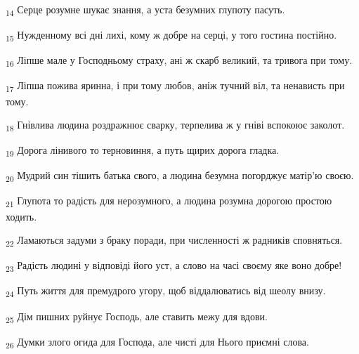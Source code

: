 \begin{tcolorbox}
\textsubscript{14} Серце розумне шукає знання, а уста безумних глупоту пасуть.
\end{tcolorbox}
\begin{tcolorbox}
\textsubscript{15} Нужденному всі дні лихі, кому ж добре на серці, у того гостина постійно.
\end{tcolorbox}
\begin{tcolorbox}
\textsubscript{16} Ліпше мале у Господньому страху, ані ж скарб великий, та тривога при тому.
\end{tcolorbox}
\begin{tcolorbox}
\textsubscript{17} Ліпша пожива яринна, і при тому любов, аніж тучний віл, та ненависть при тому.
\end{tcolorbox}
\begin{tcolorbox}
\textsubscript{18} Гнівлива людина роздражнює сварку, терпелива ж у гніві вспокоює заколот.
\end{tcolorbox}
\begin{tcolorbox}
\textsubscript{19} Дорога лінивого то терновиння, а путь щирих дорога гладка.
\end{tcolorbox}
\begin{tcolorbox}
\textsubscript{20} Мудрий син тішить батька свого, а людина безумна погорджує матір'ю своєю.
\end{tcolorbox}
\begin{tcolorbox}
\textsubscript{21} Глупота то радість для нерозумного, а людина розумна дорогою простою ходить.
\end{tcolorbox}
\begin{tcolorbox}
\textsubscript{22} Ламаються задуми з браку поради, при численності ж радників сповняться.
\end{tcolorbox}
\begin{tcolorbox}
\textsubscript{23} Радість людині у відповіді його уст, а слово на часі своєму яке воно добре!
\end{tcolorbox}
\begin{tcolorbox}
\textsubscript{24} Путь життя для премудрого угору, щоб віддалюватись від шеолу внизу.
\end{tcolorbox}
\begin{tcolorbox}
\textsubscript{25} Дім пишних руйнує Господь, але ставить межу для вдови.
\end{tcolorbox}
\begin{tcolorbox}
\textsubscript{26} Думки злого огида для Господа, але чисті для Нього приємні слова.
\end{tcolorbox}
